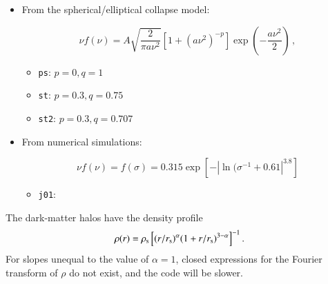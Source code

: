 \documentclass[11pt, chapterprefix, headsepline]{scrartcl}
\newcommand{\ud}{\mathrm{d}}
\begin{document}
\begin{itemize}

\item From the spherical/elliptical collapse model:

  \begin{equation}
    \nu f(\nu) = A \sqrt{\frac{2}{\pi a\nu^2}} \left [ 1+ (a\nu^2)^{-p} \right
    ] \exp \left ( -\frac{a\nu^2}{2} \right ) \, ,
    \label{eq:nufnu}
  \end{equation}

  \begin{itemize}

  \item \texttt{ps}: $p = 0, q = 1$
    \citep{1974ApJ...187..425P}

  \item \texttt{st}: $p = 0.3, q = 0.75$
    \citep{1999MNRAS.308..119S}

  \item \texttt{st2}: $p = 0.3, q = 0.707$
    \citep{1999MNRAS.308..119S}

  \end{itemize}

\item From numerical simulations:

  \begin{equation}
    \nu f(\nu) = f(\sigma) = 0.315 \exp\left[ - | \ln(\sigma^{-1} + 0.61 |^{3.8} \right]
  \end{equation}

  \begin{itemize}
  \item \texttt{j01}: \citep{2001MNRAS.321..372J}
  \end{itemize}

\end{itemize}


\bigskip

The dark-matter halos have the density profile
%
\begin{equation}
  \rho(r) = \rho_{\rm s} \left[ (r/r_{\rm s})^\alpha (1 + r/r_{\rm s})^{3
      - \alpha} \right]^{-1}.
\end{equation}
%
For slopes unequal to the \citet{NFW} value of $\alpha = 1$, closed
expressions for the Fourier transform of $\rho$ do not exist, and the
code will be slower.
\end{document}
